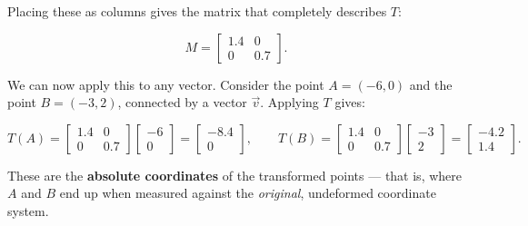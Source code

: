 \documentclass[11pt,openany]{book}
\theoremstyle{definition}
\begin{document}
Placing these as columns gives the matrix that completely describes $T$:

\[
M = \begin{bmatrix} 1.4 & 0 \\ 0 & 0.7 \end{bmatrix}.
\]

We can now apply this to any vector. Consider the point $A = (-6, 0)$ and the point
$B = (-3, 2)$, connected by a vector $\vec{v}$.
Applying $T$ gives:

\[
T(A) = \begin{bmatrix} 1.4 & 0 \\ 0 & 0.7 \end{bmatrix} \begin{bmatrix} -6 \\ 0 \end{bmatrix}
= \begin{bmatrix} -8.4 \\ 0 \end{bmatrix},
\qquad
T(B) = \begin{bmatrix} 1.4 & 0 \\ 0 & 0.7 \end{bmatrix} \begin{bmatrix} -3 \\ 2 \end{bmatrix}
= \begin{bmatrix} -4.2 \\ 1.4 \end{bmatrix}.
\]

These are the \textbf{absolute coordinates} of the transformed points --- that is, where
$A$ and $B$ end up when measured against the \textit{original}, undeformed coordinate system.

\medskip
\end{document}
